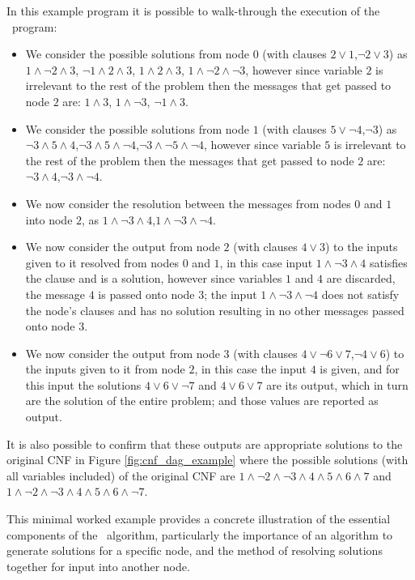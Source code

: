 \documentclass[
10pt, %
a4paper, %
oneside, %
headinclude,footinclude, %
BCOR5mm, %
]{scrartcl}
\begin{document}
In this example program it is possible to walk-through the execution of the \dagster\  program:
\begin{itemize}[noitemsep]
\item	We consider the possible solutions from node $0$ (with clauses $2\lor 1$,$\neg 2\lor 3$) as $1\land \neg 2\land 3$, $\neg 1\land 2\land 3$, $1\land 2\land 3$, $1\land \neg 2\land \neg 3$, 
however since variable $2$ is irrelevant to the rest of the problem then the messages that get passed to node $2$ are: $1\land 3$, $1\land \neg 3$, $\neg 1\land 3$.
\item	We consider the possible solutions from node $1$ (with clauses $5\lor \neg 4$,$\neg 3$) as $\neg 3\land 5\land 4$,$\neg 3\land 5\land \neg 4$,$\neg 3\land \neg 5\land \neg 4$, however 
since variable $5$ is irrelevant to the rest of the problem then the messages that get passed to node $2$ are: $\neg 3\land 4$,$\neg 3\land \neg 4$.
\item	We now consider the resolution between the messages from nodes $0$ and $1$ into node $2$, as $1\land \neg 3\land 4$,$1\land \neg 3\land \neg 4$.
\item	We now consider the output from node $2$ (with clauses $4\lor 3$) to the inputs given to it resolved from nodes $0$ and $1$, in this case input $1\land \neg 3\land 4$ satisfies the clause and
is a solution, however since variables $1$ and $4$ are discarded, the message $4$ is passed onto node $3$; the input $1\land \neg 3\land \neg 4$ does not satisfy the node's clauses and has no solution
resulting in no other messages passed onto node $3$.
\item	We now consider the output from node $3$ (with clauses $4\lor\neg 6\lor 7$,$\neg 4\lor 6$) to the inputs given to it from node $2$, in this case the input $4$ is given, and for this input
the solutions $4\lor 6\lor\neg 7$ and $4\lor 6\lor 7$ are its output, which in turn are the solution of the entire problem; and those values are reported as output.
\end{itemize}

It is also possible to confirm that these outputs are appropriate solutions to the original CNF in Figure \ref{fig:cnf_dag_example} where the possible solutions (with all variables included)
of the original CNF are $1\land\neg 2\land\neg 3\land 4\land 5\land 6\land 7$ and $1\land\neg 2\land\neg 3\land 4\land 5\land 6\land\neg 7$.

This minimal worked example provides a concrete illustration of the essential components of the \dagster\  algorithm, particularly the importance of an algorithm to generate solutions for a specific
node, and the method of resolving solutions together for input into another node.
\end{document}

